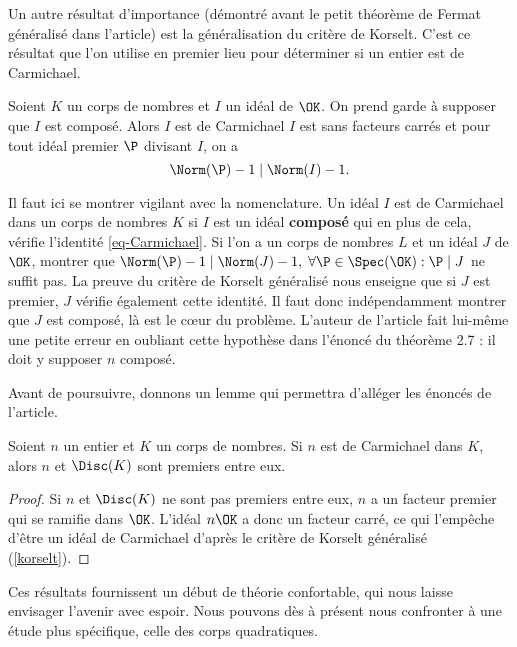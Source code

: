 Un autre résultat d'importance (démontré avant le petit théorème de Fermat généralisé dans l'article) est la généralisation du critère de Korselt. C'est ce résultat que l'on utilise en premier lieu pour déterminer si un entier est de Carmichael.

\begin{theoreme}\label{korselt}
	Soient $K$ un corps de nombres et $I$ un idéal de $\OK$. On prend garde à supposer que $I$ est composé. Alors $I$ est de Carmichael \ssi $I$ est sans facteurs carrés et pour tout idéal premier $\P$ divisant $I$, on a $$\Norm(\P) - 1 \mid \Norm(I) - 1.$$
\end{theoreme}

\begin{remarque}
	Il faut ici se montrer vigilant avec la nomenclature. Un idéal $I$ est de Carmichael dans un corps de nombres $K$ si $I$ est un idéal \textbf{composé} qui en plus de cela, vérifie l'identité \ref{eq-Carmichael}. Si l'on a un corps de nombres $L$ et un idéal $J$ de $\OK$, montrer que $\Norm(\P) - 1\mid \Norm(J) - 1,\; \forall \P\in \Spec(\OK) : \P\mid J$ ne suffit pas. La preuve du critère de Korselt généralisé nous enseigne que si $J$ est premier, $J$ vérifie également cette identité. Il faut donc indépendamment montrer que $J$ est composé, là est le cœur du problème. L'auteur de l'article fait lui-même une petite erreur en oubliant cette hypothèse dans l'énoncé du théorème 2.7 : il doit y supposer $n$ composé.
\end{remarque}

Avant de poursuivre, donnons un lemme qui permettra d'alléger les énoncés de l'article.

\begin{lemme}
	Soient $n$ un entier et $K$ un corps de nombres. Si $n$ est de Carmichael dans $K$, alors $n$ et $\Disc(K)$ sont premiers entre eux.
\end{lemme}

\begin{proof}
	Si $n$ et $\Disc(K)$ ne sont pas premiers entre eux, $n$ a un facteur premier qui se ramifie dans $\OK$. L'idéal $n\OK$ a donc un facteur carré, ce qui l'empêche d'être un idéal de Carmichael d'après le critère de Korselt généralisé (\ref{korselt}).
\end{proof}

Ces résultats fournissent un début de théorie confortable, qui nous laisse envisager l'avenir avec espoir. Nous pouvons dès à présent nous confronter à une étude plus spécifique, celle des corps quadratiques.
